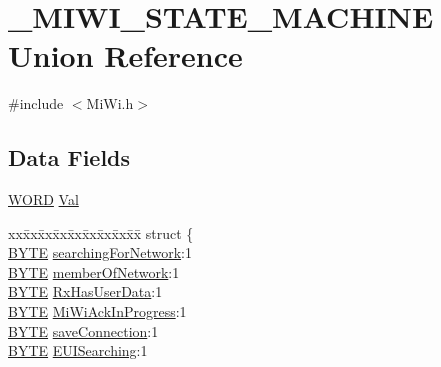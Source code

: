 \hypertarget{union___m_i_w_i___s_t_a_t_e___m_a_c_h_i_n_e}{}\section{\+\_\+\+M\+I\+W\+I\+\_\+\+S\+T\+A\+T\+E\+\_\+\+M\+A\+C\+H\+I\+N\+E Union Reference}
\label{union___m_i_w_i___s_t_a_t_e___m_a_c_h_i_n_e}


{\ttfamily \#include $<$Mi\+Wi.\+h$>$}

\subsection*{Data Fields}
\begin{DoxyCompactItemize}
\item 
\hyperlink{_generic_type_defs_8h_a2b0e863dadf920709ec53d9088ee7c91}{W\+O\+R\+D} \hyperlink{union___m_i_w_i___s_t_a_t_e___m_a_c_h_i_n_e_aa498550e7f87da9a38dc71609652e6bd}{Val}
\item 
\begin{tabbing}
xx\=xx\=xx\=xx\=xx\=xx\=xx\=xx\=xx\=\kill
struct \{\\
\>\hyperlink{_generic_type_defs_8h_a4ae1dab0fb4b072a66584546209e7d58}{BYTE} \hyperlink{union___m_i_w_i___s_t_a_t_e___m_a_c_h_i_n_e_a62f7a43ad78993dcdc82f03efcd70e39}{searchingForNetwork}:1\\
\>\hyperlink{_generic_type_defs_8h_a4ae1dab0fb4b072a66584546209e7d58}{BYTE} \hyperlink{union___m_i_w_i___s_t_a_t_e___m_a_c_h_i_n_e_a12f95db7a5a3d767584c795472c04b50}{memberOfNetwork}:1\\
\>\hyperlink{_generic_type_defs_8h_a4ae1dab0fb4b072a66584546209e7d58}{BYTE} \hyperlink{union___m_i_w_i___s_t_a_t_e___m_a_c_h_i_n_e_a5ad307b7e7b6edfcc4e142992da87e43}{RxHasUserData}:1\\
\>\hyperlink{_generic_type_defs_8h_a4ae1dab0fb4b072a66584546209e7d58}{BYTE} \hyperlink{union___m_i_w_i___s_t_a_t_e___m_a_c_h_i_n_e_a1e7e5e71094c72a15a545f7599a3ecb6}{MiWiAckInProgress}:1\\
\>\hyperlink{_generic_type_defs_8h_a4ae1dab0fb4b072a66584546209e7d58}{BYTE} \hyperlink{union___m_i_w_i___s_t_a_t_e___m_a_c_h_i_n_e_aef5cd963559aa6f2dcf644b975d0d0a4}{saveConnection}:1\\
\>\hyperlink{_generic_type_defs_8h_a4ae1dab0fb4b072a66584546209e7d58}{BYTE} \hyperlink{union___m_i_w_i___s_t_a_t_e___m_a_c_h_i_n_e_ad71b043e17be1404831423dfb08bcde6}{EUISearching}:1\\

\end{tabbing}
\end{DoxyCompactItemize}
